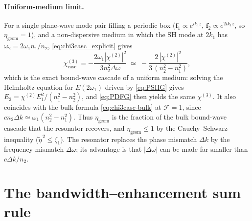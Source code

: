 \documentclass[11pt,a4paper]{article}
\newcommand{\bvec}[1]{\mathbf{#1}}
\newcommand{\f}{\bvec{f}}
\newcommand{\chitwo}{\chi^{(2)}}
\newcommand{\chithree}{\chi^{(3)}}
\newcommand{\Dom}{\Delta\omega}
\begin{document}
\paragraph{Uniform-medium limit.}  For a single plane-wave mode pair
filling a periodic box ($\f_1\propto e^{ik_1z}$, $\f_2\propto e^{2ik_1z}$,
so $\eta_\text{geom}=1$), and a non-dispersive medium in which the SH
mode at $2k_1$ has $\omega_2=2\omega_1n_1/n_2$,
\eqref{eq:chi3casc_explicit} gives
\begin{equation}
  \chithree_\text{casc}=-\frac{2\omega_1|\chitwo|^2}{3n_2^2\Dom}
  \;\simeq\;-\frac{2\,|\chitwo|^2}{3\,(n_2^2-n_1^2)},
\end{equation}
which is the exact bound-wave cascade of a uniform medium: solving the
Helmholtz equation for $E(2\omega_1)$ driven by \eqref{eq:PSHG} gives
$E_2=\chitwo E_1^2/(n_1^2-n_2^2)$, and \eqref{eq:PDFG} then yields the
same $\chithree$.  It also coincides with the bulk formula
\eqref{eq:chi3casc-bulk} at $\mathcal F=1$, since
$cn_2\Delta k\simeq\omega_1(n_2^2-n_1^2)$.  Thus $\eta_\text{geom}$ is
the fraction of the bulk bound-wave cascade that the resonator
recovers, and $\eta_\text{geom}\le1$ by the Cauchy--Schwarz inequality
($\widetilde\eta^{\,2}\le\zeta_1$).  The resonator replaces the phase
mismatch $\Delta k$ by the frequency mismatch $\Dom$; its advantage is
that $|\Dom|$ can be made far smaller than $c\Delta k/n_2$.

\section{The bandwidth--enhancement sum rule}\label{sec:sumrule}
\end{document}
